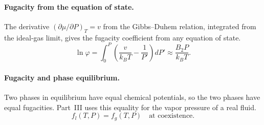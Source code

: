 \paragraph{Fugacity from the equation of state.}
The derivative $(\partial\mu/\partial P)_T=v$ from the Gibbs--Duhem relation,
integrated from the ideal-gas limit, gives the fugacity coefficient from any
equation of state.
\begin{equation}
    \boxed{\ln\varphi=\int_0^P\left(\frac{v}{k_BT}-\frac{1}{P'}\right)dP'
    \approx\frac{B_2P}{k_BT}.}
\end{equation}

\paragraph{Fugacity and phase equilibrium.}
Two phases in equilibrium have equal chemical potentials, so the two phases
have equal fugacities. Part~III uses this equality for the vapor pressure
of a real fluid.
\begin{equation}
    \boxed{f_l(T,P)=f_g(T,P)\quad\text{at coexistence.}}
\end{equation}
